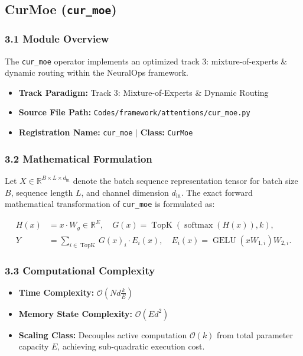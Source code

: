 \subsection{CurMoe (\texttt{cur\_moe})}
\label{sec:app_module_cur\_moe}

\subsubsection*{3.1 Module Overview}
The \texttt{cur\_moe} operator implements an optimized track 3: mixture-of-experts \& dynamic routing within the NeuralOps framework.
\begin{itemize}
    \item \textbf{Track Paradigm:} Track 3: Mixture-of-Experts & Dynamic Routing
    \item \textbf{Source File Path:} \texttt{Codes/framework/attentions/cur\_moe.py}
    \item \textbf{Registration Name:} \texttt{cur\_moe} $\mid$ \textbf{Class:} \texttt{CurMoe}
\end{itemize}

\subsubsection*{3.2 Mathematical Formulation}
Let $X \in \mathbb{R}^{B \times L \times d_{\text{in}}}$ denote the batch sequence representation tensor for batch size $B$, sequence length $L$, and channel dimension $d_{\text{in}}$. The exact forward mathematical transformation of \texttt{cur\_moe} is formulated as:

\begin{align}
H(x) &= x \cdot W_g \in \mathbb{R}^{E}, \quad G(x) = \operatorname{TopK}\left(\operatorname{softmax}(H(x)), k\right), \\
Y &= \sum_{i \in \operatorname{TopK}} G(x)_i \cdot E_i(x), \quad E_i(x) = \operatorname{GELU}(x W_{1, i}) W_{2, i}.
\end{align}


\subsubsection*{3.3 Computational Complexity}
\begin{itemize}
    \item \textbf{Time Complexity:} $\mathcal{O}(N d \frac{k}{E})$
    \item \textbf{Memory State Complexity:} $\mathcal{O}(E d^2)$
    \item \textbf{Scaling Class:} Decouples active computation $\mathcal{O}(k)$ from total parameter capacity $E$, achieving sub-quadratic execution cost.
\end{itemize}

